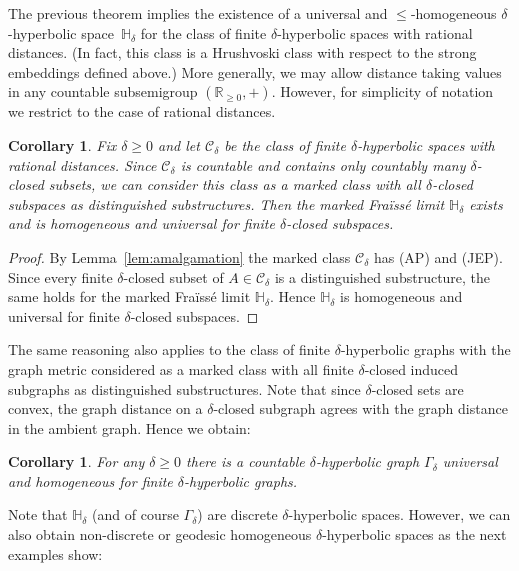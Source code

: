 \documentclass{amsart}
\newcommand{\G}{\Gamma}
\renewcommand{\d}{\delta}
\renewcommand{\H}{\mathbb{H}}
\newcommand{\C}{\mathcal{C}}
\newtheorem{corollary}[defi]{Corollary}
\begin{document}
The previous theorem implies the  existence of a  universal and $\leq$-homogeneous $\d$-hyperbolic space~$\H_\d$ for the class of finite $\d$-hyperbolic spaces with rational distances. (In fact, this class is a Hrushvoski class with respect to the strong embeddings defined above.)  More generally, we may allow distance taking values in any countable subsemigroup $(\mathbb{R}_{\geq 0},+)$. However, for simplicity of notation we restrict to the case of rational distances.

\begin{corollary}\label{cor: finite hyperbolic class}
Fix $\d\geq 0$ and let $\C_\d$ be the class of finite $\d$-hyperbolic spaces with rational distances. Since $\C_\d$ is countable and contains only countably many $\d$-closed subsets, we can consider this class as a marked class with all  $\d$-closed subspaces as distinguished substructures. Then the marked Fra\"iss\'e limit $\H_\d$ exists and is homogeneous and universal for finite $\d$-closed subspaces.
\end{corollary}
\begin{proof}
By Lemma~\ref{lem:amalgamation} the marked class $\C_\d$ has (AP) and (JEP). Since every finite $\d$-closed subset of $A\in\C_\d$ is a distinguished substructure, the same holds for the marked Fra\"iss\'e limit $\H_\d$.  Hence $\H_\d$ is homogeneous and universal for finite $\d$-closed subspaces.
\end{proof}

The same reasoning also applies to the class of finite $\d$-hyperbolic graphs with the graph metric considered as a marked class with all finite $\d$-closed  induced subgraphs as distinguished substructures. Note that since $\d$-closed sets are convex, the graph distance on a $\d$-closed subgraph agrees with the graph distance in the ambient graph. Hence we obtain:

\begin{corollary}\label{cor: finite hyperbolic graphs}
For  any $\d\geq 0$ there is a countable $\d$-hyperbolic graph $\G_\d$  universal and homogeneous for finite $\d$-hyperbolic graphs.
\end{corollary}


Note that $\H_\d$ (and of course $\G_\d$) are discrete $\d$-hyperbolic spaces. However, we can also obtain non-discrete or geodesic homogeneous $\d$-hyperbolic spaces as the next examples show:
\end{document}
